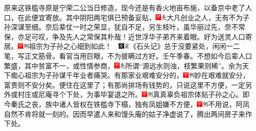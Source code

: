 原来这铁槛寺原是宁荣二公当日修造，现今还是有香火地亩布施，以备京中老了人口，在此便宜寄放。其中阴阳两宅俱已预备妥贴，{\includegraphics[width=3mm]{../Images/00002}\includegraphics[width=3mm]{../Images/00012}\footnotesize \kaishu 大凡创业之人，无有不为子孙深谋至细。奈后辈仗一时之荣显，犹自不足，另生枝叶，虽华丽过先，奈不常保，亦足可叹，争及先人之常保其朴哉！近世浮华子弟齐来着眼。}好为送灵人口寄居。{\includegraphics[width=3mm]{../Images/00002}\includegraphics[width=3mm]{../Images/00011}\footnotesize \kaishu 祖宗为子孙之心细到如此！　\includegraphics[width=3mm]{../Images/00004}\includegraphics[width=3mm]{../Images/00010}\footnotesize \kaishu 《石头记》总于没要紧处，闲闲一二笔，写正文筋骨。看官当用巨眼，不为彼瞒过方好。壬午季春。}不想如今后辈人口繁盛，其中贫富不一，或性情参商，{\includegraphics[width=3mm]{../Images/00002}\includegraphics[width=3mm]{../Images/00012}\footnotesize \kaishu 所谓“源远水则浊，枝繁果则稀”。余为天下痴心祖宗为子孙谋千年业者痛哭。}有那家业艰难安分的，{\includegraphics[width=3mm]{../Images/00002}\includegraphics[width=3mm]{../Images/00011}\footnotesize \kaishu 妙在艰难就安分，富贵则不安分矣。}便住在这里了；有那尚排场有钱势的，只说这里不方便，一定另外或村庄或尼庵寻个下处，为事毕宴退之所。{\includegraphics[width=3mm]{../Images/00002}\includegraphics[width=3mm]{../Images/00011}\footnotesize \kaishu 真真辜负祖宗体贴子孙之心。}即今秦氏之丧，族中诸人皆权在铁槛寺下榻，独有凤姐嫌不方便，{\includegraphics[width=3mm]{../Images/00002}\includegraphics[width=3mm]{../Images/00011}\footnotesize \kaishu 不用说，阿凤自然不肯将就一刻的。}因而早遣人来和馒头庵的姑子净虚说了，腾出两间房子来作下处。

